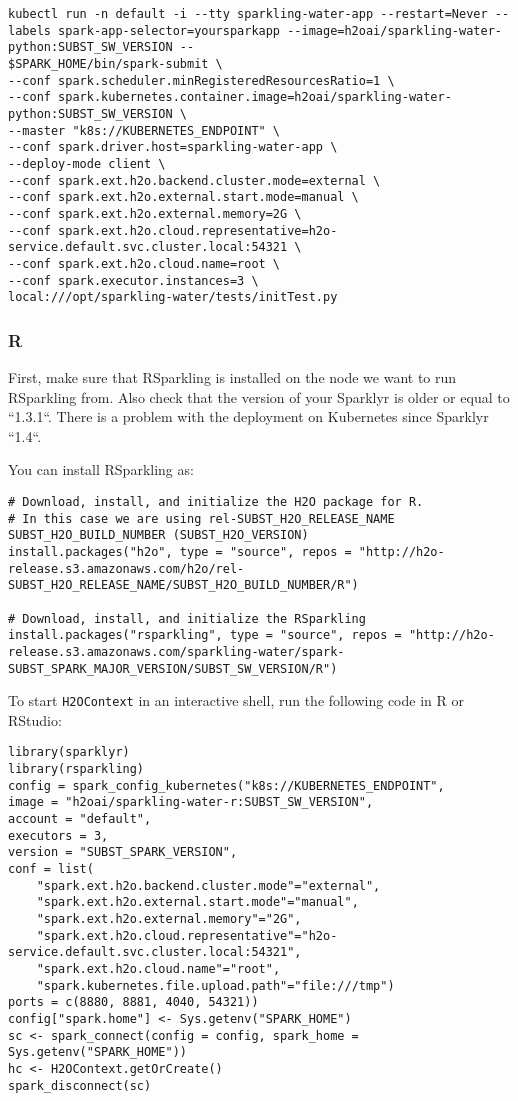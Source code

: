 \begin{lstlisting}[style=Bash]
kubectl run -n default -i --tty sparkling-water-app --restart=Never --labels spark-app-selector=yoursparkapp --image=h2oai/sparkling-water-python:SUBST_SW_VERSION --
$SPARK_HOME/bin/spark-submit \
--conf spark.scheduler.minRegisteredResourcesRatio=1 \
--conf spark.kubernetes.container.image=h2oai/sparkling-water-python:SUBST_SW_VERSION \
--master "k8s://KUBERNETES_ENDPOINT" \
--conf spark.driver.host=sparkling-water-app \
--deploy-mode client \
--conf spark.ext.h2o.backend.cluster.mode=external \
--conf spark.ext.h2o.external.start.mode=manual \
--conf spark.ext.h2o.external.memory=2G \
--conf spark.ext.h2o.cloud.representative=h2o-service.default.svc.cluster.local:54321 \
--conf spark.ext.h2o.cloud.name=root \
--conf spark.executor.instances=3 \
local:///opt/sparkling-water/tests/initTest.py
\end{lstlisting}

\subsubsection{R}

First, make sure that RSparkling is installed on the node we want to run RSparkling from. Also check that the version
of your Sparklyr is older or equal to ``1.3.1``. There is a problem with the deployment on Kubernetes since Sparklyr ``1.4``.

You can install RSparkling as:

\begin{lstlisting}[style=R]
# Download, install, and initialize the H2O package for R.
# In this case we are using rel-SUBST_H2O_RELEASE_NAME SUBST_H2O_BUILD_NUMBER (SUBST_H2O_VERSION)
install.packages("h2o", type = "source", repos = "http://h2o-release.s3.amazonaws.com/h2o/rel-SUBST_H2O_RELEASE_NAME/SUBST_H2O_BUILD_NUMBER/R")

# Download, install, and initialize the RSparkling
install.packages("rsparkling", type = "source", repos = "http://h2o-release.s3.amazonaws.com/sparkling-water/spark-SUBST_SPARK_MAJOR_VERSION/SUBST_SW_VERSION/R")
\end{lstlisting}

To start \texttt{H2OContext} in an interactive shell, run the following code in R or RStudio:

\begin{lstlisting}[style=R]
library(sparklyr)
library(rsparkling)
config = spark_config_kubernetes("k8s://KUBERNETES_ENDPOINT",
image = "h2oai/sparkling-water-r:SUBST_SW_VERSION",
account = "default",
executors = 3,
version = "SUBST_SPARK_VERSION",
conf = list(
    "spark.ext.h2o.backend.cluster.mode"="external",
    "spark.ext.h2o.external.start.mode"="manual",
    "spark.ext.h2o.external.memory"="2G",
    "spark.ext.h2o.cloud.representative"="h2o-service.default.svc.cluster.local:54321",
    "spark.ext.h2o.cloud.name"="root",
    "spark.kubernetes.file.upload.path"="file:///tmp")
ports = c(8880, 8881, 4040, 54321))
config["spark.home"] <- Sys.getenv("SPARK_HOME")
sc <- spark_connect(config = config, spark_home = Sys.getenv("SPARK_HOME"))
hc <- H2OContext.getOrCreate()
spark_disconnect(sc)
\end{lstlisting}


